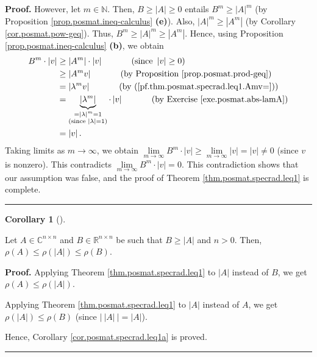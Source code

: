 \documentclass[numbers=enddot,12pt,final,onecolumn,notitlepage]{scrartcl}%
\numberwithin{exer}{subsection}
\theoremstyle{definition}
\newtheorem{coro}[theo]{Corollary}
\newenvironment{corollary}[1][]
{\begin{coro}[#1]\begin{leftbar}}
{\end{leftbar}\end{coro}}
\newenvironment{proof}[1][Proof]{\noindent\textbf{#1.} }{\ \rule{0.5em}{0.5em}}
\begin{document}
\begin{proof}
However, let $m\in\mathbb{N}$. Then, $B\geq\left\vert A\right\vert \geq0$
entails $B^{m}\geq\left\vert A\right\vert ^{m}$ (by Proposition
\ref{prop.posmat.ineq-calculus} \textbf{(e)}). Also, $\left\vert A\right\vert
^{m}\geq\left\vert A^{m}\right\vert $ (by Corollary \ref{cor.posmat.pow-geq}).
Thus, $B^{m}\geq\left\vert A\right\vert ^{m}\geq\left\vert A^{m}\right\vert $.
Hence, using Proposition \ref{prop.posmat.ineq-calculus} \textbf{(b)}, we
obtain%
\begin{align*}
B^{m}\cdot\left\vert v\right\vert  &  \geq\left\vert A^{m}\right\vert
\cdot\left\vert v\right\vert \ \ \ \ \ \ \ \ \ \ \left(  \text{since
}\left\vert v\right\vert \geq0\right) \\
&  \geq\left\vert A^{m}v\right\vert \ \ \ \ \ \ \ \ \ \ \left(  \text{by
Proposition \ref{prop.posmat.prod-geq}}\right) \\
&  =\left\vert \lambda^{m}v\right\vert \ \ \ \ \ \ \ \ \ \ \left(  \text{by
(\ref{pf.thm.posmat.specrad.leq1.Amv=})}\right) \\
&  =\underbrace{\left\vert \lambda^{m}\right\vert }_{\substack{=\left\vert
\lambda\right\vert ^{m}=1\\\text{(since }\left\vert \lambda\right\vert
=1\text{)}}}\cdot\left\vert v\right\vert \ \ \ \ \ \ \ \ \ \ \left(  \text{by
Exercise \ref{exe.posmat.abs-lamA}}\right) \\
&  =\left\vert v\right\vert .
\end{align*}
Taking limits as $m\rightarrow\infty$, we obtain $\lim\limits_{m\rightarrow
\infty}B^{m}\cdot\left\vert v\right\vert \geq\lim\limits_{m\rightarrow\infty
}\left\vert v\right\vert =\left\vert v\right\vert \neq0$ (since $v$ is
nonzero). This contradicts $\lim\limits_{m\rightarrow\infty}B^{m}%
\cdot\left\vert v\right\vert =0$. This contradiction shows that our assumption
was false, and the proof of Theorem \ref{thm.posmat.specrad.leq1} is complete.
\end{proof}

\begin{corollary}
\label{cor.posmat.specrad.leq1a}Let $A\in\mathbb{C}^{n\times n}$ and
$B\in\mathbb{R}^{n\times n}$ be such that $B\geq\left\vert A\right\vert $ and
$n>0$. Then, $\rho\left(  A\right)  \leq\rho\left(  \left\vert A\right\vert
\right)  \leq\rho\left(  B\right)  $.
\end{corollary}

\begin{proof}
Applying Theorem \ref{thm.posmat.specrad.leq1} to $\left\vert A\right\vert $
instead of $B$, we get $\rho\left(  A\right)  \leq\rho\left(  \left\vert
A\right\vert \right)  $.

Applying Theorem \ref{thm.posmat.specrad.leq1} to $\left\vert A\right\vert $
instead of $A$, we get $\rho\left(  \left\vert A\right\vert \right)  \leq
\rho\left(  B\right)  $ (since $\left\vert \ \left\vert A\right\vert
\ \right\vert =\left\vert A\right\vert $).

Hence, Corollary \ref{cor.posmat.specrad.leq1a} is proved.
\end{proof}
\end{document}
